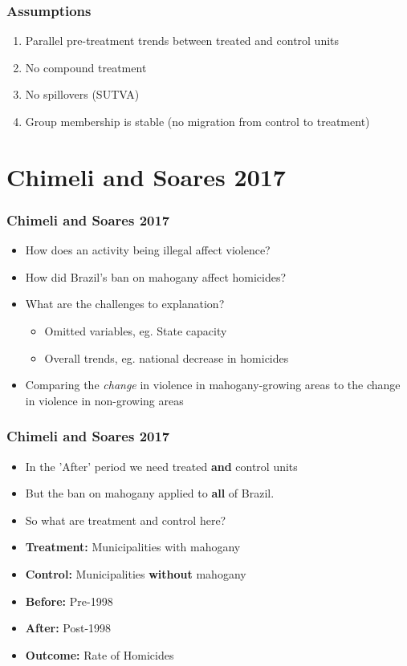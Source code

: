 \documentclass[xcolor=x11names,compress]{beamer}\usepackage[]{graphicx}\usepackage[]{color}
\renewcommand{\(}{\begin{columns}}
\renewcommand{\)}{\end{columns}}
\newcommand{\<}[1]{\begin{column}{#1}}
\renewcommand{\>}{\end{column}}
\begin{document}
\begin{frame}
\frametitle{Assumptions}
\begin{enumerate}
\item Parallel pre-treatment trends between treated and control units
\pause
\item No compound treatment
\pause
\item No spillovers (SUTVA)
\pause
\item Group membership is stable (no migration from control to treatment)
\end{enumerate}
\end{frame}

\section{Chimeli and Soares 2017}

\begin{frame}
\frametitle{Chimeli and Soares 2017}
\begin{itemize}
\item How does an activity being illegal affect violence?
\pause
\item How did Brazil's ban on mahogany affect homicides?
\pause
\item What are the challenges to explanation?
\pause
\begin{itemize}
\item Omitted variables, eg. State capacity
\pause
\item Overall trends, eg. national decrease in homicides
\end{itemize}
\item Comparing the \textit{change} in violence in mahogany-growing areas to the change in violence in non-growing areas
\end{itemize}
\end{frame}

\begin{frame}
\frametitle{Chimeli and Soares 2017}
\begin{itemize}
\item In the 'After' period we need treated \textbf{and} control units 
\pause
\item But the ban on mahogany applied to \textbf{all} of Brazil.
\pause
\item So what are treatment and control here?
\pause
\item \textbf{Treatment:} \pause Municipalities with mahogany
\pause
\item \textbf{Control:} \pause Municipalities \textbf{without} mahogany
\pause
\item \textbf{Before:} \pause Pre-1998
\pause
\item \textbf{After:} \pause Post-1998
\pause 
\item \textbf{Outcome:} \pause Rate of Homicides
\end{itemize}
\end{frame}
\end{document}
